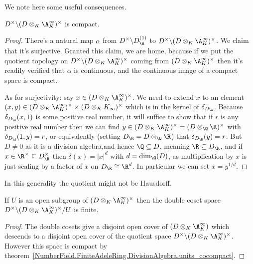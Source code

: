 We note here some useful consequences.

\begin{theorem}
  \label{NumberField.FiniteAdeleRing.DivisionAlgebra.units_cocompact}
  \leanok
  $D^\times\backslash(D\otimes_K\A_K^\infty)^\times$ is compact.
\end{theorem}
\begin{proof}
There's a natural map $\alpha$ from $D^\times\backslash D_{\A}^{(1)}$ to
  $D^\times\backslash (D\otimes_K \A_K^\infty)^\times$. We claim that it's
  surjective. Granted this claim, we are home, because if we put the quotient
  topology on $D^\times\backslash (D\otimes_K \A_K^\infty)^\times$ coming from
  $(D\otimes_K \A_K^\infty)^\times$ then it's readily verified that $\alpha$
  is continuous, and the continuous image of a compact space is compact.

  As for surjectivity: say $x\in (D\otimes_K \A_K^\infty)^\times$. We need to extend
  $x$ to an element $(x,y)\in (D\otimes_K \A_K^\infty)^\times\times(D\otimes_K K_\infty)^\times$
  which is in the kernel of $\delta_{D_{\A}}$. Because $\delta_{D_{\A}}(x,1)$ is some positive
  real number, it will suffice to show that if $r$ is any positive real number then we can
  find $y\in (D\otimes_K \A_K^\infty)^\times=(D\otimes_{\Q}\R)^\times$ with $\delta_{D_{\A}}(1,y)=r$,
  or equivalently (setting $D_{\R}=D\otimes_{\Q}\R$) that $\delta_{D_{\R}}(y)=r$.
  But $D\not=0$ as it is a division algebra,and hence $\Q\subseteq D$, meaning
  $\R\subseteq D_{\R}$, and if
  $x\in\R^\times\subseteq D_{\R}^\times$ then $\delta(x)=|x|^d$ with $d=\dim_{\Q}(D)$,
  as multiplication by $x$ is just scaling by a factor of $x$ on $D_{\R}\cong\R^d$.
  In particular we can set $x=y^{1/d}$.
\end{proof}
\begin{remark} In this generality the quotient might not be Hausdorff.
\end{remark}

\begin{theorem}
  \label{NumberField.FiniteAdeleRing.DivisionAlgebra.finiteDoubleCoset}
  \leanok
  If $U$ is an open subgroup of $(D\otimes_K \A_K^\infty)^\times$
  then the double coset space $D^\times\backslash(D\otimes_K \A_K^\infty)^\times/U$ is finite.
\end{theorem}
\begin{proof} The double cosets give a disjoint open cover of $(D\otimes_K \A_K^\infty)$
  which descends to a disjoint open cover of the quotient space
  $D^\times\backslash(D\otimes_K \A_K^\infty)^\times$. However this space is compact
  by theorem~\ref{NumberField.FiniteAdeleRing.DivisionAlgebra.units_cocompact}.
\end{proof}
